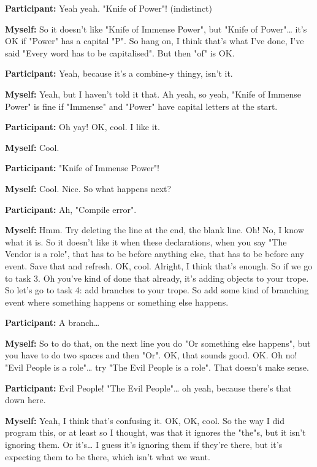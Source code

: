 \documentclass[11pt]{report}
\newcommand{\llabel}[1]{\hypertarget{llineno:#1}{\linelabel{#1}}}
\begin{document}
\begin{linenumbers}
\textbf{Participant:} Yeah yeah. "Knife of Power"! (indistinct)

\textbf{Myself:} So it doesn't like "Knife of Immense Power", but "Knife of Power"\ldots{} it's OK if "Power" has a capital "P". So hang on, I think that's what I've done, I've said "Every word has to be capitalised". But then "of" is OK.\llabel{lne:syntax5c3}

\textbf{Participant:} Yeah, because it's a combine-y thingy, isn't it.

\textbf{Myself:} Yeah, but I haven't told it that. Ah yeah, so yeah, "Knife of Immense Power" is fine if "Immense" and "Power" have capital letters at the start.

\textbf{Participant:} Oh yay! OK, cool. I like it.

\textbf{Myself:} Cool.

\textbf{Participant:} "Knife of Immense Power"!

\textbf{Myself:} Cool. Nice. So what happens next?

\textbf{Participant:} Ah, "Compile error".

\textbf{Myself:} Hmm. Try deleting the line at the end, the blank line. Oh! No,
I know what it is. So it doesn't like it when these declarations, when you say
"The Vendor is a role", that has to be before anything else, that has to be
before any event. Save that and refresh. OK, cool. Alright, I think that's
enough. So if we go to task 3. Oh you've kind of done that already, it's adding
objects to your trope. So let's go to task 4: add branches to your trope. So add
some kind of branching event where something happens or something else
happens.\llabel{lne:syntax4c}

\textbf{Participant:} A branch\ldots{}

\textbf{Myself:} So to do that, on the next line you do "Or something else happens", but you have to do two spaces and then "Or". OK, that sounds good. OK. Oh no! "Evil People is a role"\ldots{} try "The Evil People is a role". That doesn't make sense.

\textbf{Participant:} Evil People! "The Evil People"\ldots{} oh yeah, because there's that down here.

\textbf{Myself:} Yeah, I think that's confusing it. OK, OK, cool. So the way I did program this, or at least so I thought, was that it ignores the "the"s, but it isn't ignoring them. Or it's\ldots{} I guess it's ignoring them if they're there, but it's expecting them to be there, which isn't what we want.


\end{linenumbers}
\end{document}
